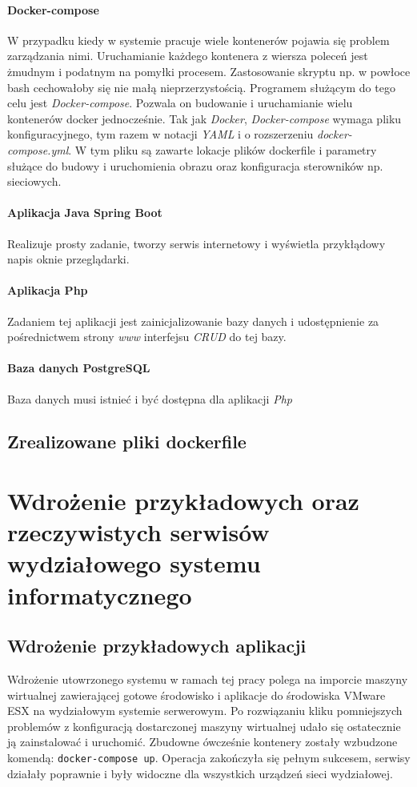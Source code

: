 \documentclass[polish, a4paper, 12pt, oneside]{book}
\begin{document}
\subsubsection{Docker-compose}
W przypadku kiedy w systemie pracuje wiele kontenerów pojawia się problem zarządzania nimi. Uruchamianie każdego kontenera z wiersza poleceń jest żmudnym i podatnym na pomyłki procesem. Zastosowanie skryptu np. w powłoce bash cechowałoby się nie małą nieprzerzystością. Programem służącym do tego celu jest \textit{Docker-compose}. Pozwala on budowanie i uruchamianie wielu kontenerów docker jednocześnie. Tak jak \textit{Docker}\cite{docker}, \textit{Docker-compose}\cite{dockercompose} wymaga pliku konfiguracyjnego, tym razem w notacji \textit{YAML} i o rozszerzeniu \textit{docker-compose.yml}. W tym pliku są zawarte lokacje plików dockerfile i parametry służące do budowy i uruchomienia obrazu oraz konfiguracja sterowników np. sieciowych. 
\subsubsection{Aplikacja Java Spring Boot}
Realizuje prosty zadanie, tworzy serwis internetowy i wyświetla przykłądowy napis oknie przeglądarki.
\subsubsection{Aplikacja Php}
Zadaniem tej aplikacji jest zainicjalizowanie bazy danych i udostępnienie za pośrednictwem strony \textit{www} interfejsu \textit{CRUD} do tej bazy.
\subsubsection{Baza danych PostgreSQL}
Baza danych musi istnieć i być dostępna dla aplikacji \textit{Php}
\section{Zrealizowane pliki dockerfile}

\chapter{Wdrożenie przykładowych oraz rzeczywistych serwisów wydziałowego systemu informatycznego}
\section{Wdrożenie przykładowych aplikacji}
Wdrożenie utowrzonego systemu w ramach tej pracy polega na imporcie maszyny wirtualnej zawierającej gotowe środowisko i aplikacje do środowiska VMware ESX na wydziałowym systemie serwerowym. Po rozwiązaniu kliku pomniejszych problemów z konfiguracją dostarczonej maszyny wirtualnej udało się ostatecznie ją zainstalować i uruchomić. Zbudowne ówcześnie kontenery zostały wzbudzone komendą: \texttt{docker-compose up}. Operacja zakończyła się pełnym sukcesem, serwisy działały poprawnie i były widoczne dla wszystkich urządzeń sieci wydziałowej.
\end{document}
